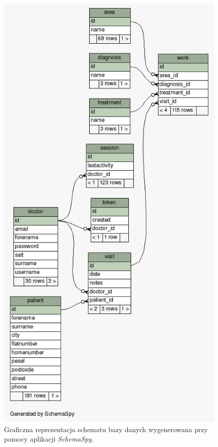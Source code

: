 \documentclass[11pt]{aghdpl}
\begin{document}
\begin{figure}[h!]
	\centering
	\includegraphics[height=\textheight * 4/5]{dbschema}
	\caption{Graficzna reprezentacja schematu bazy danych wygenerowana przy pomocy aplikacji \emph{SchemaSpy}.}
	\label{fig:dbschema}
\end{figure}
\end{document}
